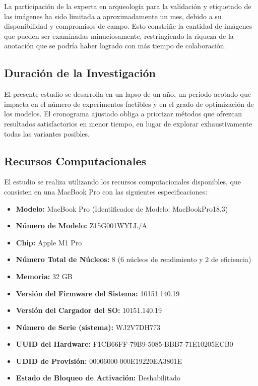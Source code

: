 La participación de la experta en arqueología para la validación y etiquetado de las imágenes ha sido limitada a aproximadamente un mes, debido a su disponibilidad y compromisos de campo. Esto constriñe la cantidad de imágenes que pueden ser examinadas minuciosamente, restringiendo la riqueza de la anotación que se podría haber logrado con más tiempo de colaboración.

\subsection{Duración de la Investigación}

El presente estudio se desarrolla en un lapso de un año, un periodo acotado que impacta en el número de experimentos factibles y en el grado de optimización de los modelos. El cronograma ajustado obliga a priorizar métodos que ofrezcan resultados satisfactorios en menor tiempo, en lugar de explorar exhaustivamente todas las variantes posibles.

\subsection{Recursos Computacionales}

El estudio se realiza utilizando los recursos computacionales disponibles, que consisten en una MacBook Pro con las siguientes especificaciones:

\begin{itemize}
   \item \textbf{Modelo:} MacBook Pro (Identificador de Modelo: MacBookPro18,3)
   \item \textbf{Número de Modelo:} Z15G001WYLL/A
   \item \textbf{Chip:} Apple M1 Pro
   \item \textbf{Número Total de Núcleos:} 8 (6 núcleos de rendimiento y 2 de eficiencia)
   \item \textbf{Memoria:} 32 GB
   \item \textbf{Versión del Firmware del Sistema:} 10151.140.19
   \item \textbf{Versión del Cargador del SO:} 10151.140.19
   \item \textbf{Número de Serie (sistema):} WJ2V7DH773
   \item \textbf{UUID del Hardware:} F1CB66FF-79B9-5085-BBB7-71E10205ECB0
   \item \textbf{UDID de Provisión:} 00006000-000E19220EA3801E
   \item \textbf{Estado de Bloqueo de Activación:} Deshabilitado
\end{itemize}


